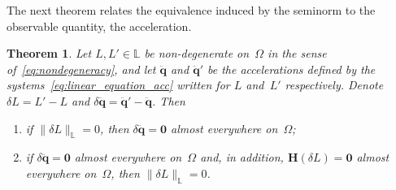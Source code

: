 \documentclass[sn-mathphys-num]{sn-jnl}
\theoremstyle{thmstylethree}
\theoremstyle{thmstyletwo}
\theoremstyle{thmstyleone}
\newtheorem{theorem}{Theorem}
\begin{document}
The next theorem relates the equivalence induced by the seminorm to the observable quantity, the acceleration.
\begin{theorem} \label{lemmaeq}
Let $L, L' \in \mathbb{L}$ be non-degenerate on~$\Omega$ in the sense of~\eqref{eq:nondegeneracy}, and let $\ddot{\mathbf{q}}$ and $\ddot{\mathbf{q}}'$ be the accelerations defined by the systems~\eqref{eq:linear_equation_acc} written for $L$ and~$L'$ respectively. Denote $\delta L = L' - L$ and $\delta \ddot{\mathbf{q}} = \ddot{\mathbf{q}}' - \ddot{\mathbf{q}}$. Then
\begin{enumerate}
\item if $\|\delta L\|_{\mathbb{L}} = 0$, then $\delta \ddot{\mathbf{q}} = \mathbf{0}$ almost everywhere on~$\Omega$;
\item if $\delta \ddot{\mathbf{q}} = \mathbf{0}$ almost everywhere on~$\Omega$ and, in addition, $\mathbf{H}(\delta L) = \mathbf{0}$ almost everywhere on~$\Omega$, then $\|\delta L\|_{\mathbb{L}} = 0$.
\end{enumerate}
\end{theorem}
\end{document}

